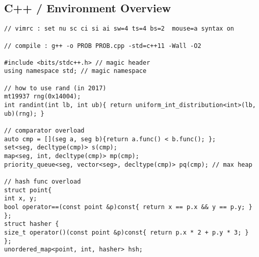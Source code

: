 \documentclass[landscape, 10pt, a4paper, oneside,  twocolumn]{article}
\begin{document}
\subsection {C++ / Environment Overview}
\begin{verbatim}	
// vimrc : set nu sc ci si ai sw=4 ts=4 bs=2  mouse=a syntax on

// compile : g++ -o PROB PROB.cpp -std=c++11 -Wall -O2

#include <bits/stdc++.h> // magic header
using namespace std; // magic namespace

// how to use rand (in 2017)
mt19937 rng(0x14004);
int randint(int lb, int ub){ return uniform_int_distribution<int>(lb, ub)(rng); }

// comparator overload
auto cmp = [](seg a, seg b){return a.func() < b.func(); };
set<seg, decltype(cmp)> s(cmp); 
map<seg, int, decltype(cmp)> mp(cmp);
priority_queue<seg, vector<seg>, decltype(cmp)> pq(cmp); // max heap

// hash func overload
struct point{
int x, y;
bool operator==(const point &p)const{ return x == p.x && y == p.y; }
};
struct hasher {
size_t operator()(const point &p)const{ return p.x * 2 + p.y * 3; }
};
unordered_map<point, int, hasher> hsh;

\end{verbatim}
\end{document}
